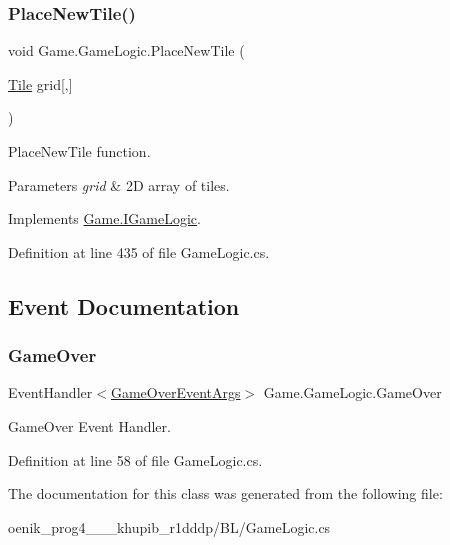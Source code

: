 \subsubsection{\texorpdfstring{PlaceNewTile()}{PlaceNewTile()}}
{\footnotesize\ttfamily void Game.\+Game\+Logic.\+Place\+New\+Tile (\begin{DoxyParamCaption}\item[{\mbox{\hyperlink{class_game_1_1_tile}{Tile}}}]{grid\mbox{[},\mbox{]} }\end{DoxyParamCaption})}



Place\+New\+Tile function. 


\begin{DoxyParams}{Parameters}
{\em grid} & 2D array of tiles.\\
\hline
\end{DoxyParams}


Implements \mbox{\hyperlink{interface_game_1_1_i_game_logic_af4c46a6bc7485d51c95c3eaad66daddf}{Game.\+I\+Game\+Logic}}.



Definition at line 435 of file Game\+Logic.\+cs.



\subsection{Event Documentation}
\mbox{\label{class_game_1_1_game_logic_a8a784b2845447428fe14f9e57ae9c2bf}} 
\subsubsection{\texorpdfstring{GameOver}{GameOver}}
{\footnotesize\ttfamily Event\+Handler$<$\mbox{\hyperlink{class_game_1_1_game_over_event_args}{Game\+Over\+Event\+Args}}$>$ Game.\+Game\+Logic.\+Game\+Over}



Game\+Over Event Handler. 



Definition at line 58 of file Game\+Logic.\+cs.



The documentation for this class was generated from the following file\+:\begin{DoxyCompactItemize}
\item 
oenik\+\_\+prog4\+\_\+\_\+\_\+khupib\+\_\+r1dddp/\+B\+L/Game\+Logic.\+cs\end{DoxyCompactItemize}
